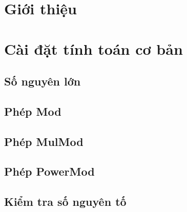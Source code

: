 \documentclass[12pt]{article}
\begin{document}



{
  \hypersetup{linkcolor=black}
  \tableofcontents\newpage\cleardoublepage
}


\section{Giới thiệu}
\newpage\cleardoublepage

\section{Cài đặt tính toán cơ bản}
\subsection{Số nguyên lớn}


\subsection{Phép Mod}


\subsection{Phép MulMod}


\subsection{Phép PowerMod}


\subsection{Kiểm tra số nguyên tố}

\end{document}
